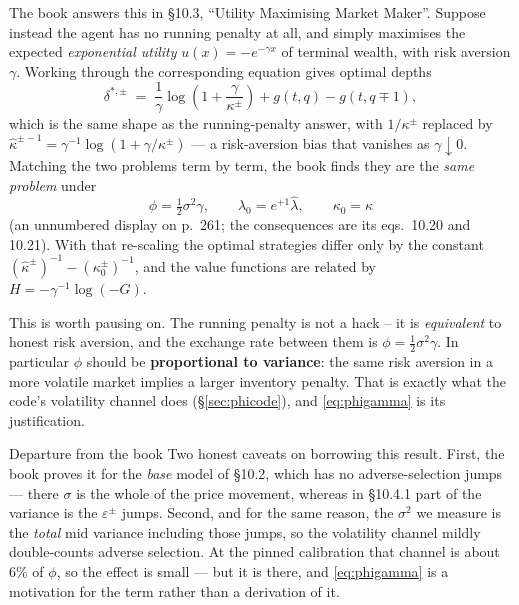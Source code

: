 \documentclass[11pt,a4paper]{article}
\begin{document}
The book answers this in \S10.3, ``Utility Maximising Market Maker''. Suppose
instead the agent has no running penalty at all, and simply maximises the
expected \emph{exponential utility} $u(x) = -e^{-\gamma x}$ of terminal wealth,
with risk aversion $\gamma$. Working through the corresponding equation gives
optimal depths
\[
  \delta^{*,\pm} \;=\; \frac{1}{\gamma}\log\!\left(1 + \frac{\gamma}{\kappa^{\pm}}\right)
  + g(t,q) - g(t,q\mp1),
  \tag{10.19}
\]
which is the same shape as the running-penalty answer, with $1/\kappa^{\pm}$
replaced by $\hat{\kappa}^{\pm-1} = \gamma^{-1}\log(1+\gamma/\kappa^{\pm})$ ---
a risk-aversion bias that vanishes as $\gamma \downarrow 0$. Matching the two
problems term by term, the book finds they are the \emph{same problem} under
\begin{equation}
  \boxed{\;\phi = \tfrac{1}{2}\sigma^{2}\gamma,
  \qquad \lambda_0 = e^{+1}\hat{\lambda},
  \qquad \kappa_0 = \kappa\;}
  \label{eq:phigamma}
\end{equation}
(an unnumbered display on p.~261; the consequences are its eqs.~10.20 and 10.21).
With that re-scaling the optimal strategies differ only by the constant
$(\hat{\kappa}^{\pm})^{-1} - (\kappa_0^{\pm})^{-1}$, and the value functions are
related by $H = -\gamma^{-1}\log(-G)$.

\begin{intuition}
This is worth pausing on. The running penalty is not a hack -- it is
\emph{equivalent} to honest risk aversion, and the exchange rate between them is
$\phi = \tfrac12\sigma^2\gamma$. In particular $\phi$ should be
\textbf{proportional to variance}: the same risk aversion in a more volatile
market implies a larger inventory penalty. That is exactly what the code's
volatility channel does (\S\ref{sec:phicode}), and \eqref{eq:phigamma} is its
justification.
\end{intuition}

\begin{departure}{Departure from the book}
Two honest caveats on borrowing this result. First, the book proves it for the
\emph{base} model of \S10.2, which has no adverse-selection jumps --- there
$\sigma$ is the whole of the price movement, whereas in \S10.4.1 part of the
variance is the $\varepsilon^{\pm}$ jumps. Second, and for the same reason, the
$\sigma^{2}$ we measure is the \emph{total} mid variance including those jumps,
so the volatility channel mildly double-counts adverse selection. At the pinned
calibration that channel is about 6\% of $\phi$, so the effect is small --- but
it is there, and \eqref{eq:phigamma} is a motivation for the term rather than a
derivation of it.
\end{departure}
\end{document}
